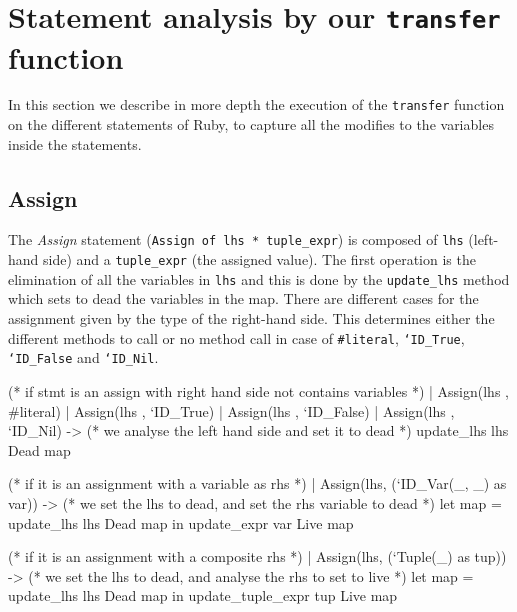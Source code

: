 \documentclass[a4paper]{article}   %
\begin{document}
\section{Statement analysis by our \texttt{transfer} function}
\label{transfer}

In this section we describe in more depth the execution of the \texttt{transfer} function on the different statements of Ruby, to capture all the modifies to the variables inside the statements. %

\subsection{Assign}

The \emph{Assign} statement (\texttt{Assign of lhs * tuple\_expr}) is composed of \texttt{lhs} (left-hand side) and a \texttt{tuple\_expr} (the assigned value).
The first operation is the elimination of all the variables in \texttt{lhs} and this is done by the \texttt{update\_lhs} method which sets to dead the variables in the map.
There are different cases for the assignment given by the type of the right-hand side. This determines either the different methods to call or no method call in case of \texttt{\#literal}, \texttt{`ID\_True}, \texttt{`ID\_False} and \texttt{`ID\_Nil}.

\begin{ocaml}
(* if stmt is an assign with right hand side not contains variables *)
| Assign(lhs , #literal) 
| Assign(lhs , `ID_True) 
| Assign(lhs , `ID_False)
| Assign(lhs , `ID_Nil) -> 
    (* we analyse the left hand side and set it to dead *)
    update_lhs lhs Dead map

(* if it is an assignment with a variable as rhs *)
| Assign(lhs, (`ID_Var(_, _) as var)) -> 
    (* we set the lhs to dead, and set the rhs variable to dead *)
    let map = update_lhs lhs Dead map in 
    update_expr var Live map

(* if it is an assignment with a composite rhs *)   
| Assign(lhs, (`Tuple(_) as tup)) -> 
    (* we set the lhs to dead, and analyse the rhs to set to live *)
    let map = update_lhs lhs Dead map in
    update_tuple_expr tup Live map
\end{ocaml}
\end{document}

